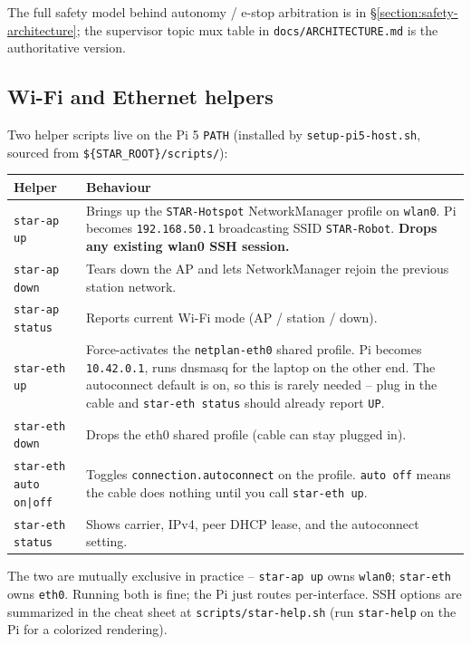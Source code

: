 The full safety model behind autonomy / e-stop arbitration is in
\S\ref{section:safety-architecture}; the supervisor topic mux table
in \texttt{docs/ARCHITECTURE.md} is the authoritative version.

\subsection{Wi-Fi and Ethernet helpers}

Two helper scripts live on the Pi 5 \texttt{PATH} (installed by
\texttt{setup-pi5-host.sh}, sourced from
\texttt{\$\{STAR\_ROOT\}/scripts/}):

\begin{center}
\begin{tabular}{|p{3.0cm}|p{11.7cm}|}
\hline
\textbf{Helper} & \textbf{Behaviour} \\
\hline
\texttt{star-ap up} & Brings up the \texttt{STAR-Hotspot}
NetworkManager profile on \texttt{wlan0}. Pi becomes
\texttt{192.168.50.1} broadcasting SSID \texttt{STAR-Robot}.
\textbf{Drops any existing wlan0 SSH session.} \\
\hline
\texttt{star-ap down} & Tears down the AP and lets
NetworkManager rejoin the previous station network. \\
\hline
\texttt{star-ap status} & Reports current Wi-Fi mode (AP / station / down). \\
\hline
\texttt{star-eth up} & Force-activates the
\texttt{netplan-eth0} shared profile. Pi becomes
\texttt{10.42.0.1}, runs dnsmasq for the laptop on the other end.
The autoconnect default is on, so this is rarely needed -- plug in
the cable and \texttt{star-eth status} should already report
\texttt{UP}. \\
\hline
\texttt{star-eth down} & Drops the eth0 shared profile (cable can
stay plugged in). \\
\hline
\texttt{star-eth auto on|off} & Toggles
\texttt{connection.autoconnect} on the profile.
\texttt{auto off} means the cable does nothing until you call
\texttt{star-eth up}. \\
\hline
\texttt{star-eth status} & Shows carrier, IPv4, peer DHCP lease,
and the autoconnect setting. \\
\hline
\end{tabular}
\end{center}

The two are mutually exclusive in practice -- \texttt{star-ap up} owns
\texttt{wlan0}; \texttt{star-eth} owns \texttt{eth0}. Running both is
fine; the Pi just routes per-interface. SSH options are summarized
in the cheat sheet at \texttt{scripts/star-help.sh} (run
\texttt{star-help} on the Pi for a colorized rendering).

